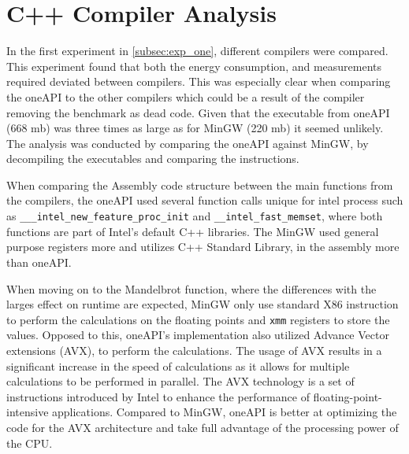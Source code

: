 \section{C++ Compiler Analysis}\label{app:compiler-analysis}

In the first experiment in \cref{subsec:exp_one}, different compilers were compared. This experiment found that both the energy consumption, and measurements required deviated between compilers. This was especially clear when comparing the oneAPI to the other compilers which could be a result of the compiler removing the benchmark as dead code. Given that the executable from oneAPI (668 mb) was three times as large as for MinGW (220 mb) it seemed unlikely. The analysis was conducted by comparing the oneAPI against MinGW, by decompiling the executables and comparing the instructions.

When comparing the Assembly code structure between the main functions from the compilers, the oneAPI used several function calls unique for intel process such as \texttt{\_\_\_intel\_new\_feature\_proc\_init} and \texttt{\_\_intel\_fast\_memset}, where both functions are part of Intel's default C++ libraries\cite{Intelassembly}. The MinGW used general purpose registers more and utilizes C++ Standard Library, in the assembly more than oneAPI.




When moving on to the Mandelbrot function, where the differences with the larges effect on runtime are expected, MinGW only use standard X86 instruction\cite{X86} to perform the calculations on the floating points and \texttt{xmm} registers to store the values. Opposed to this, oneAPI's implementation also utilized Advance Vector extensions (AVX)\cite{AVXIntel}, to perform the calculations. The usage of AVX results in a significant increase in the speed of calculations as it allows for multiple calculations to be performed in parallel. The AVX technology is a set of instructions introduced by Intel to enhance the performance of floating-point-intensive applications\cite{AVXIntel}. Compared to MinGW, oneAPI is better at optimizing the code for the AVX architecture and take full advantage of the processing power of the CPU. 

